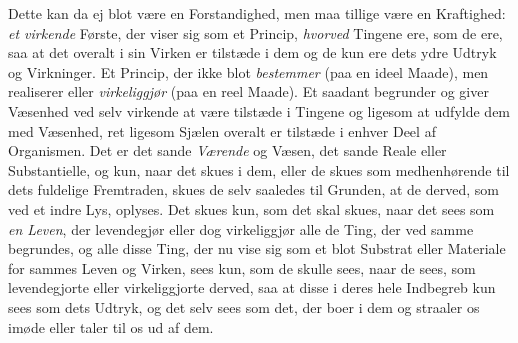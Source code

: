 \documentclass[12pt,a4paper]{book}
\newcommand{\apage}[1]{\marginnote{\footnotesize\textit{[#1]}}}
\begin{document}
Dette kan da ej blot være en Forstandighed, men maa tillige være en Kraftighed:
\emph{et virkende} Første, der viser sig som et Princip, \emph{hvorved} Tingene
ere, som de ere, saa at det overalt i sin Virken er tilstæde i dem og de kun ere
dets ydre Udtryk og Virkninger. Et Princip, der ikke blot \emph{bestemmer} (paa
en ideel Maade), men realiserer eller \emph{virkeliggjør} (paa en reel Maade). Et
saadant begrunder og giver Væsenhed ved selv virkende at være tilstæde i Tingene
og ligesom at udfylde dem med Væsenhed, ret ligesom Sjælen overalt er tilstæde i
enhver Deel af Organismen. Det er det sande \emph{Værende} og \apage{106} Væsen, det sande
Reale eller Substantielle, og kun, naar det skues i dem, eller de skues som
medhenhørende til dets fuldelige Fremtraden, skues de selv saaledes til Grunden,
at de derved, som ved et indre Lys, oplyses. Det skues kun, som det skal skues,
naar det sees som \emph{en Leven}, der levendegjør eller dog virkeliggjør alle de
Ting, der ved samme begrundes, og alle disse Ting, der nu vise sig som et blot
Substrat eller Materiale for sammes Leven og Virken, sees kun, som de skulle sees,
naar de sees, som levendegjorte eller virkeliggjorte derved, saa at disse i deres
hele Indbegreb kun sees som dets Udtryk, og det selv sees som det, der boer i dem
og straaler os imøde eller taler til os ud af dem.
\end{document}
